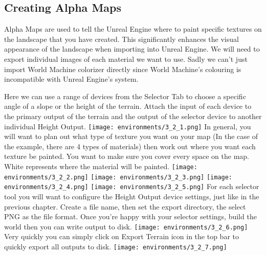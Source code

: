 \documentclass[../main.tex]{subfiles}
\begin{document}
\subsection{Creating Alpha Maps}
Alpha Maps are used to tell the Unreal Engine where to paint specific textures on the landscape that you have created. This significantly enhances the visual appearance of the landscape when importing into Unreal Engine. We will need to export individual images of each material we want to use. Sadly we can’t just import World Machine colorizer directly since World Machine’s colouring is incompatible with Unreal Engine’s system.

Here we can use a range of devices from the Selector Tab to choose a specific angle of a slope or the height of the terrain. Attach the input of each device to the primary output of the terrain and the output of the selector device to another individual Height Output.
\texttt{[image: environments/3\_2\_1.png]}
In general, you will want to plan out what type of texture you want on your map (In the case of the example, there are 4 types of materials) then work out where you want each texture be painted. You want to make sure you cover every space on the map. White represents where the material will be painted.
\texttt{[image: environments/3\_2\_2.png]}
\texttt{[image: environments/3\_2\_3.png]}
\texttt{[image: environments/3\_2\_4.png]}
\texttt{[image: environments/3\_2\_5.png]}
For each selector tool you will want to configure the Height Output device settings, just like in the previous chapter.
Create a file name, then set the export directory, the select PNG as the file format.
Once you’re happy with your selector settings, build the world then you can write output to disk.
\texttt{[image: environments/3\_2\_6.png]}
Very quickly you can simply click on Export Terrain icon  in the top bar to quickly export all outputs to disk.
\texttt{[image: environments/3\_2\_7.png]}
\end{document}
